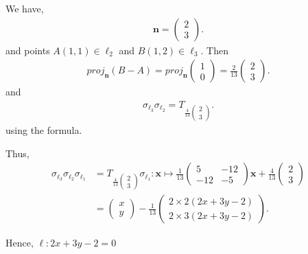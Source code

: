 \begin{solution}
 We have,
 \begin{align*}
  \mathbf{n} = \begin{pmatrix} 2 \\ 3 \end{pmatrix}
 .\end{align*}
 and points \(A(1,1) \in  \ell_{2}\) and \( B(1,2) \in  \ell_{3} \). Then 
 \begin{align*}
   proj_{\mathbf{n}} \left( B - A \right) =  proj_{\mathbf{n}}\begin{pmatrix} 1 \\ 0 \end{pmatrix} = \frac{2}{13} \begin{pmatrix} 2 \\ 3 \end{pmatrix}
 .\end{align*}
 and
 \begin{align*}
  \sigma_{\ell_{3}}\sigma_{\ell_{2}} = T_{\frac{4}{13} \begin{pmatrix} 2 \\ 3 \end{pmatrix} }
 .\end{align*}
 using the formula.


  Thus,
  \begin{align*}
    \sigma_{\ell_{3}} \sigma_{\ell_{2}} \sigma_{\ell_{1}} &= T_{\frac{4}{13} \begin{pmatrix} 2 \\ 3 \end{pmatrix} } \sigma_{\ell_{1}} : \mathbf{x} \mapsto \frac{1}{13} \begin{pmatrix} 5 & -12 \\ -12 & -5 \end{pmatrix} \mathbf{x} + \frac{4}{13} \begin{pmatrix} 2 \\ 3 \end{pmatrix} \\
                                                          &= \begin{pmatrix} x \\ y \end{pmatrix} - \frac{1}{13} \begin{pmatrix} 2 \times 2 \left( 2x + 3y -2 \right) \\ 2 \times 3 \left(2x + 3y - 2  \right) \end{pmatrix} 
  .\end{align*}

  Hence, \( \ell : 2x + 3y -2 = 0 \)

\end{solution}

